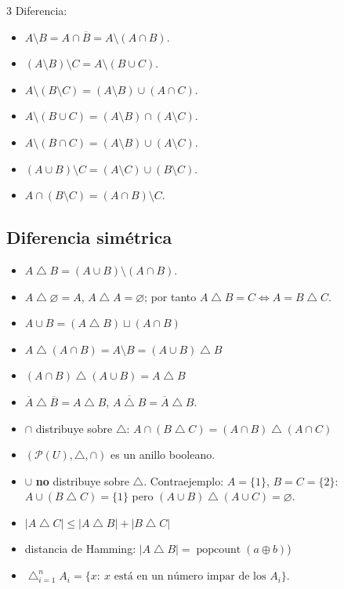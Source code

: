 \documentclass[8pt, spanish, mexico, letterpaper]{extarticle}
\newcommand{\<}{<}
\newcommand{\ov}[1]{\overline{#1}}
\newcommand{\sd}{\mathbin{\triangle}}
\newcommand{\Pw}{\mathcal{P}}
\newcommand{\card}[1]{\left|#1\right|}
\DeclareMathOperator{\popcount}{popcount}
\begin{document}
\begin{multicols*}{3}
Diferencia:
\begin{itemize}
  \item $A\setminus B=A\cap\ov B=A\setminus(A\cap B)$.
  \item $(A\setminus B)\setminus C=A\setminus(B\cup C)$.
  \item $A\setminus(B\setminus C)=(A\setminus B)\cup(A\cap C)$.
  \item $A\setminus(B\cup C)=(A\setminus B)\cap(A\setminus C)$.
  \item $A\setminus(B\cap C)=(A\setminus B)\cup(A\setminus C)$.
  \item $(A\cup B)\setminus C=(A\setminus C)\cup(B\setminus C)$.
  \item $A\cap(B\setminus C)=(A\cap B)\setminus C$.
\end{itemize}

 
\subsection{Diferencia sim\'etrica}
\begin{itemize}
  \item $A\sd B=(A\cup B)\setminus(A\cap B)$.
  \item $A\sd\varnothing=A$, \; $A\sd A=\varnothing$; por tanto $A\sd B=C\iff A=B\sd C$.
  \item $A\cup B=(A\sd B)\sqcup(A\cap B)$ \quad 
  \item $A\sd(A\cap B)=A\setminus B=(A\cup B)\sd B$  
  \item $(A\cap B)\sd(A\cup B)=A\sd B$ 
  \item $\ov A\sd\ov B=A\sd B$, \quad $\ov{A\sd B}=\ov A\sd B$.
  \item $\cap$ distribuye sobre $\sd$: $A\cap(B\sd C)=(A\cap B)\sd(A\cap C)$
  \item $(\Pw(U),\sd,\cap)$ es un anillo booleano.
  \item $\cup$ \textbf{no} distribuye sobre $\sd$. Contraejemplo: $A=\{1\}$, $B=C=\{2\}$:
        $A\cup(B\sd C)=\{1\}$ pero $(A\cup B)\sd(A\cup C)=\varnothing$.
  \item $\card{A\sd C}\le\card{A\sd B}+\card{B\sd C}$ 
  \item distancia de Hamming: $\card{A\sd B}=\popcount(a\oplus b)$)
  \item $\bigtriangleup_{i=1}^n A_i=\{x:\ x \text{ est\'a en un n\'umero impar de los } A_i\}$.
\end{itemize}
 

\end{multicols*}
\end{document}
